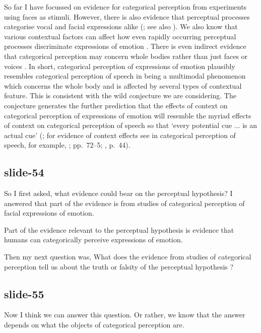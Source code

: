 \documentclass[12pt,\papersize]{extarticle}
\begin{document}
So far I have focussed on evidence for categorical perception from experiments using faces as stimuli.
However, there is also evidence that perceptual processes categorise vocal and facial expressions alike (\citealp{grandjean:2005_voices,laukka:2005_categorical}; see also \citealp{jaywant:2012_categorical}).
We also know that
various contextual factors can affect how even rapidly occurring perceptual processes discriminate expressions of emotion \citep{righart:2008_rapid}.
There is even indirect evidence that categorical perception may concern whole bodies rather than just faces or voices \citep{aviezer:2008_angry,aviezer:2011_automaticity}.
In short, categorical perception of expressions of emotion plausibly resembles categorical perception of speech in being a multimodal phenomenon which concerns the whole body and is affected by several types of contextual feature.
This is consistent with the wild conjecture we are considering.
The conjecture generates the further prediction that the effects of context on categorical perception of expressions of emotion will resemble the myriad effects of context on categorical perception of speech so that `every potential cue ... is an actual cue'
 (\citealp[p.\ 11]{Liberman:1985bn}; for evidence of context effects see in categorical perception of speech, for example, \citealp{Repp:1987xo}; \citealp{Nygaard:1995po} pp.\ 72--5; \citealp{Jusczyk:1997lz}, p.\ 44).

\subsection{slide-54}
So I first asked, what evidence could bear on the perceptual hypothesis?
I answered that part of the evidence is from studies of categorical perception
of facial expressions of emotion.

Part of the evidence relevant to the perceptual hypothesis is evidence that
humans can categorically perceive expressions of emotion.

Then my next question was,
What does the evidence from studies of categorical perception
tell us about the truth or falsity of the perceptual hypothesis ?

\subsection{slide-55}
Now I think we can answer this question.
Or rather, we know that the answer depends on what the objects of categorical perception are.
\end{document}
